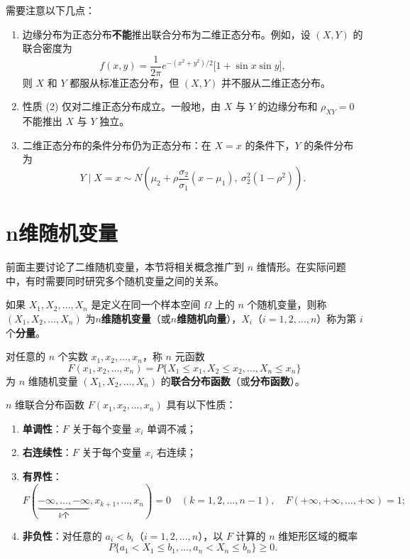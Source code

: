 \documentclass[lang=cn,11pt]{elegantbook}
\begin{document}
\begin{note}
需要注意以下几点：
\begin{enumerate}
    \item 边缘分布为正态分布\textbf{不能}推出联合分布为二维正态分布。例如，设 $(X,Y)$ 的联合密度为
    \[
    f(x,y) = \frac{1}{2\pi}e^{-(x^2+y^2)/2}\bigl[1 + \sin x\sin y\bigr],
    \]
    则 $X$ 和 $Y$ 都服从标准正态分布，但 $(X,Y)$ 并不服从二维正态分布。
    \item 性质 (2) 仅对二维正态分布成立。一般地，由 $X$ 与 $Y$ 的边缘分布和 $\rho_{XY} = 0$ 不能推出 $X$ 与 $Y$ 独立。
    \item 二维正态分布的条件分布仍为正态分布：在 $X = x$ 的条件下，$Y$ 的条件分布为
    \[
    Y \mid X=x \sim N\!\left(\mu_2 + \rho\frac{\sigma_2}{\sigma_1}(x-\mu_1),\ \sigma_2^2(1-\rho^2)\right).
    \]
\end{enumerate}
\end{note}

\section{n维随机变量}

前面主要讨论了二维随机变量，本节将相关概念推广到 $n$ 维情形。在实际问题中，有时需要同时研究多个随机变量之间的关系。

\begin{definition}[$n$维随机变量] \label{def:n-d-random-variable}
如果 $X_1, X_2, \dots, X_n$ 是定义在同一个样本空间 $\Omega$ 上的 $n$ 个随机变量，则称 $(X_1, X_2, \dots, X_n)$ 为\textbf{$n$维随机变量}（或\textbf{$n$维随机向量}），$X_i$（$i=1,2,\dots,n$）称为第 $i$ 个\textbf{分量}。
\end{definition}

\begin{definition}[$n$维联合分布函数] \label{def:n-joint-df}
对任意的 $n$ 个实数 $x_1, x_2, \dots, x_n$，称 $n$ 元函数
\[
F(x_1, x_2, \dots, x_n) = P\{X_1 \leqslant x_1, X_2 \leqslant x_2, \dots, X_n \leqslant x_n\}
\]
为 $n$ 维随机变量 $(X_1, X_2, \dots, X_n)$ 的\textbf{联合分布函数}（或\textbf{分布函数}）。
\end{definition}

\begin{property}[$n$维联合分布函数的性质]\label{prop:n-joint-df-property}
$n$ 维联合分布函数 $F(x_1, x_2, \dots, x_n)$ 具有以下性质：
\begin{enumerate}
    \item \textbf{单调性}：$F$ 关于每个变量 $x_i$ 单调不减；
    \item \textbf{右连续性}：$F$ 关于每个变量 $x_i$ 右连续；
    \item \textbf{有界性}：
    \[
    F(\underbrace{-\infty, \dots, -\infty}_{k\text{个}}, x_{k+1}, \dots, x_n) = 0 \quad (k=1,2,\dots,n-1), \quad F(+\infty, +\infty, \dots, +\infty) = 1;
    \]
    \item \textbf{非负性}：对任意的 $a_i < b_i$（$i=1,2,\dots,n$），以 $F$ 计算的 $n$ 维矩形区域的概率
    \[
    P\{a_1 < X_1 \leqslant b_1, \dots, a_n < X_n \leqslant b_n\} \geqslant 0.
    \]
\end{enumerate}
\end{property}
\end{document}
